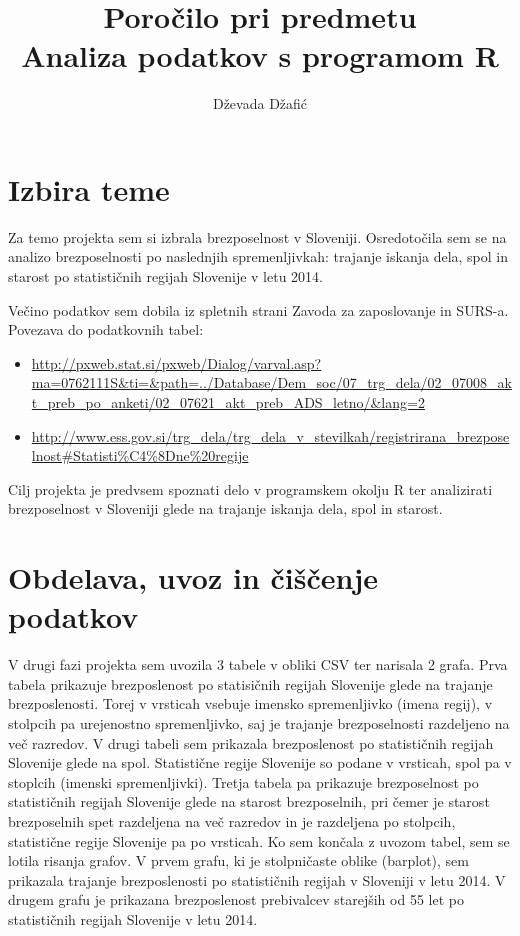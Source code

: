 \documentclass[11pt,a4paper]{article}
\begin{document}
\title{Poročilo pri predmetu \\
Analiza podatkov s programom R}
\author{Dževada Džafić}
\maketitle

\section{Izbira teme}


Za temo projekta sem si izbrala brezposelnost v Sloveniji. Osredotočila sem se na analizo brezposelnosti po naslednjih spremenljivkah: trajanje iskanja dela, spol in starost po statističnih regijah Slovenije v letu 2014.

Večino podatkov sem dobila iz spletnih strani Zavoda za zaposlovanje in SURS-a.
Povezava do podatkovnih tabel:
\begin{itemize}

\item \url{http://pxweb.stat.si/pxweb/Dialog/varval.asp?ma=0762111S&ti=&path=../Database/Dem_soc/07_trg_dela/02_07008_akt_preb_po_anketi/02_07621_akt_preb_ADS_letno/&lang=2}
\item \url{http://www.ess.gov.si/trg_dela/trg_dela_v_stevilkah/registrirana_brezposelnost#Statisti%C4%8Dne%20regije}

\end{itemize}

Cilj projekta je predvsem spoznati delo v programskem okolju R ter analizirati brezposelnost v Sloveniji glede na trajanje iskanja dela, spol in starost.


\section{Obdelava, uvoz in čiščenje podatkov}

V drugi fazi projekta sem uvozila 3 tabele v obliki CSV ter narisala 2 grafa.
Prva tabela prikazuje brezposlenost po statisičnih regijah Slovenije glede na trajanje brezposlenosti. Torej v vrsticah vsebuje imensko spremenljivko (imena regij), v stolpcih pa urejenostno spremenljivko, saj je trajanje brezposelnosti razdeljeno  na več razredov. 
V drugi tabeli sem prikazala brezposlenost po statističnih regijah Slovenije glede na spol. Statistične regije Slovenije so podane v vrsticah, spol pa v stoplcih (imenski spremenljivki). Tretja tabela pa prikazuje brezposelnost po statističnih regijah Slovenije glede na starost brezposelnih, pri čemer je starost brezposelnih spet razdeljena na več razredov in je razdeljena po stolpcih, statistične regije Slovenije pa po vrsticah.
\newpage
Ko sem končala z uvozom tabel, sem se lotila risanja grafov. V prvem grafu, ki je stolpničaste oblike (barplot), sem prikazala trajanje brezposlenosti po statističnih regijah v Sloveniji v letu 2014. V drugem grafu je prikazana brezposlenost prebivalcev starejših od 55 let po statističnih regijah Slovenije v letu 2014.
\end{document}
